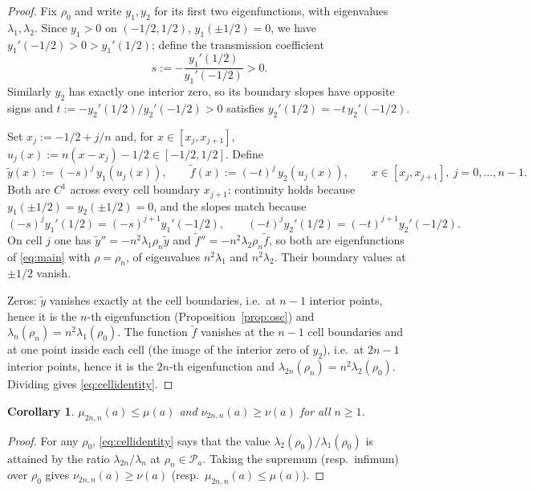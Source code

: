 ﻿\documentclass[11pt]{article}
\newtheorem{corollary}[theorem]{Corollary}
\begin{document}
\begin{proof}
	Fix $\rho_0$ and write $y_1,y_2$ for its first two eigenfunctions, with
	eigenvalues $\lambda_1,\lambda_2$.  Since $y_1>0$ on $(-1/2,1/2)$,
	$y_1(\pm 1/2)=0$, we have $y_1'(-1/2)>0>y_1'(1/2)$; define the
	transmission coefficient
	\begin{equation*}
		s:=-\frac{y_1'(1/2)}{y_1'(-1/2)}>0.
	\end{equation*}
	Similarly $y_2$ has exactly one interior zero, so its boundary slopes
	have opposite signs and
	$t:=-y_2'(1/2)/y_2'(-1/2)>0$ satisfies
	$y_2'(1/2)=-t\,y_2'(-1/2)$.

	Set $x_j:=-1/2+j/n$ and, for $x\in[x_j,x_{j+1}]$,
	$u_j(x):=n(x-x_j)-1/2\in[-1/2,1/2]$.  Define
	\begin{equation*}
		\widetilde y(x):=(-s)^j\,y_1(u_j(x)),\qquad
		\widetilde f(x):=(-t)^j\,y_2(u_j(x)),
		\qquad x\in[x_j,x_{j+1}],\ j=0,\ldots,n-1.
	\end{equation*}
	Both are $C^1$ across every cell boundary $x_{j+1}$: continuity holds
	because $y_1(\pm 1/2)=y_2(\pm 1/2)=0$, and the slopes match because
	\begin{equation*}
		(-s)^j y_1'(1/2)=(-s)^{j+1}y_1'(-1/2),\qquad
		(-t)^j y_2'(1/2)=(-t)^{j+1}y_2'(-1/2).
	\end{equation*}
	On cell $j$ one has $\widetilde y''=-n^2\lambda_1\rho_n\widetilde y$ and
	$\widetilde f''=-n^2\lambda_2\rho_n\widetilde f$, so both are
	eigenfunctions of \eqref{eq:main} with $\rho=\rho_n$, of eigenvalues
	$n^2\lambda_1$ and $n^2\lambda_2$.  Their boundary values at
	$\pm 1/2$ vanish.

	Zeros: $\widetilde y$ vanishes exactly at the cell boundaries, i.e.\ at
	$n-1$ interior points, hence it is the $n$-th eigenfunction
	(Proposition~\ref{prop:osc}) and
	$\lambda_n(\rho_n)=n^2\lambda_1(\rho_0)$.  The function
	$\widetilde f$ vanishes at the $n-1$ cell boundaries and at one point
	inside each cell (the image of the interior zero of $y_2$), i.e.\ at
	$2n-1$ interior points, hence it is the $2n$-th eigenfunction and
	$\lambda_{2n}(\rho_n)=n^2\lambda_2(\rho_0)$.  Dividing gives
	\eqref{eq:cellidentity}.
\end{proof}

\begin{corollary}\label{cor:lemma1}
	$\mu_{2n,n}(a)\le\mu(a)$ and $\nu_{2n,n}(a)\ge\nu(a)$ for all $n\ge 1$.
\end{corollary}

\begin{proof}
	For any $\rho_0$, \eqref{eq:cellidentity} says that the value
	$\lambda_2(\rho_0)/\lambda_1(\rho_0)$ is attained by the ratio
	$\lambda_{2n}/\lambda_n$ at $\rho_n\in\mathcal P_a$.  Taking the
	supremum (resp.\ infimum) over $\rho_0$ gives
	$\nu_{2n,n}(a)\ge\nu(a)$ (resp.\ $\mu_{2n,n}(a)\le\mu(a)$).
\end{proof}
\end{document}
